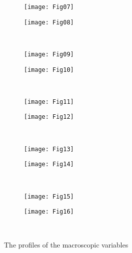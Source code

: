 \documentclass[]{jfm}
\begin{document}
\begin{figure}
    \vspace{-24pt}
    \centering
    \begin{subfigure}[b]{.5\linewidth}
        \texttt{[image: Fig07]}
        \label{fig:profile:Pxy}
    \end{subfigure}%
    \begin{subfigure}[b]{.5\linewidth}
        \texttt{[image: Fig08]}
        \label{fig:profile:vx}
    \end{subfigure}\\[-6pt]
    \begin{subfigure}[b]{.5\linewidth}
        \texttt{[image: Fig09]}
        \label{fig:profile:qx}
    \end{subfigure}%
    \begin{subfigure}[b]{.5\linewidth}
        \texttt{[image: Fig10]}
        \label{fig:profile:qy}
    \end{subfigure}\\[-6pt]
    \begin{subfigure}[b]{.5\linewidth}
        \texttt{[image: Fig11]}
        \label{fig:profile:P}
    \end{subfigure}%
    \begin{subfigure}[b]{.5\linewidth}
        \texttt{[image: Fig12]}
        \label{fig:profile:Pyy}
    \end{subfigure}\\[-6pt]
    \begin{subfigure}[b]{.5\linewidth}
        \texttt{[image: Fig13]}
        \label{fig:profile:Pxx}
    \end{subfigure}%
    \begin{subfigure}[b]{.5\linewidth}
        \texttt{[image: Fig14]}
        \label{fig:profile:Pzz}
    \end{subfigure}\\[-6pt]
\end{figure}
\begin{figure}
    \ContinuedFloat
    \begin{subfigure}[b]{.5\linewidth}
        \texttt{[image: Fig15]}
        \label{fig:profile:tau}
    \end{subfigure}%
    \begin{subfigure}[b]{.5\linewidth}
        \texttt{[image: Fig16]}
        \label{fig:profile:omega}
    \end{subfigure}\\[-12pt]
    \caption{The profiles of the macroscopic variables}
    \label{fig:profiles}
\end{figure}
\end{document}
